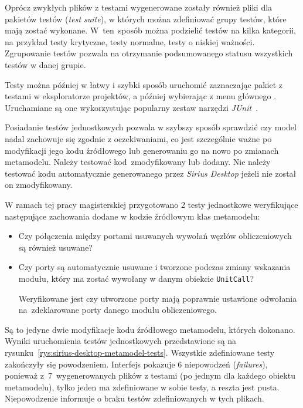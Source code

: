 Oprócz zwykłych plików z testami wygenerowane zostały również pliki dla
pakietów testów (\emph{test suite}), w których można
zdefiniować grupy testów,
które mają zostać wykonane. W~ten~sposób można podzielić testów na kilka
kategorii, na przykład testy krytyczne, testy normalne, testy o niskiej
ważności. Zgrupowanie testów pozwala na otrzymanie podsumowanego statusu
wszystkich testów w danej grupie.

Testy można później w łatwy i szybki sposób uruchomić zaznaczając pakiet z
testami w eksploratorze projektów, a później wybierając z menu głównego
. Uruchamiane są one wykorzystując popularny
zestaw narzędzi \emph{JUnit}~\cite{junit-test-tutorial}.

Posiadanie testów jednostkowych pozwala w szybszy sposób sprawdzić czy model
nadal zachowuje się zgodnie z oczekiwaniami, co jest szczególnie ważne po
modyfikacji jego kodu źródłowego lub generowaniu go na nowo po zmianach
metamodelu. Należy testować kod~zmodyfikowany lub dodany. Nie należy testować
kodu automatycznie generowanego przez \emph{Sirius Desktop} jeżeli nie został
on zmodyfikowany.

W ramach tej pracy magisterskiej przygotowano 2 testy jednostkowe weryfikujące
następujące zachowania dodane w kodzie źródłowym klas metamodelu:

\begin{itemize}
	\item Czy połączenia między portami usuwanych wywołań węzłów obliczeniowych są również usuwane?

	\item Czy porty są automatycznie usuwane i tworzone podczas zmiany wskazania modułu, który ma zostać wywołany w danym obiekcie \texttt{UnitCall}?

	      Weryfikowane jest czy utworzone porty mają poprawnie ustawione odwołania na~zdeklarowane porty danego modułu obliczeniowego.
\end{itemize}

Są to jedyne dwie modyfikacje kodu źródłowego metamodelu, których dokonano.
Wyniki uruchomienia testów jednostkowych przedstawione są na
rysunku~\ref{rys:sirius-desktop-metamodel-tests}. Wszystkie zdefiniowane testy
zakończyły się powodzeniem. Interfejs pokazuje 6 niepowodzeń (\emph{failures}),
ponieważ z~7~wygenerowanych plików z testami (po jednym dla każdego obiektu
metamodelu), tylko jeden ma zdefiniowane w sobie testy, a reszta jest pusta.
Niepowodzenie informuje o braku testów zdefiniowanych w tych plikach.

